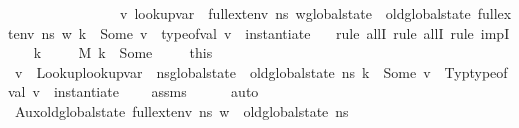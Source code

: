 \begin{isabellebody}
\ \ \ \ \ \ \ \ \ \ \ \ \ \ \ \ {\isacharparenleft}{\kern0pt}{\isasymexists}v{\isachardot}{\kern0pt}\ lookup{\isacharunderscore}{\kern0pt}var\ {\isasymLambda}\ {\isacharparenleft}{\kern0pt}{\isacharparenleft}{\kern0pt}full{\isacharunderscore}{\kern0pt}ext{\isacharunderscore}{\kern0pt}env\ n{\isacharunderscore}{\kern0pt}s\ w{\isacharparenright}{\kern0pt}{\isasymlparr}global{\isacharunderscore}{\kern0pt}state\ {\isacharcolon}{\kern0pt}{\isacharequal}{\kern0pt}\ old{\isacharunderscore}{\kern0pt}global{\isacharunderscore}{\kern0pt}state\ {\isacharparenleft}{\kern0pt}full{\isacharunderscore}{\kern0pt}ext{\isacharunderscore}{\kern0pt}env\ n{\isacharunderscore}{\kern0pt}s\ w{\isacharparenright}{\kern0pt}{\isasymrparr}{\isacharparenright}{\kern0pt}\ k\ {\isacharequal}{\kern0pt}\ Some\ v\ {\isasymand}\ type{\isacharunderscore}{\kern0pt}of{\isacharunderscore}{\kern0pt}val\ v\ {\isacharequal}{\kern0pt}\ instantiate\ {\isasymOmega}\ {\isasymtau}{\isacharparenright}{\kern0pt}{\isachardoublequoteclose}\isanewline
%
\isadelimproof
%
\endisadelimproof
%
\isatagproof
{}\isamarkupfalse%
\ {\isacharparenleft}{\kern0pt}rule\ allI{\isacharcomma}{\kern0pt}\ rule\ allI{\isacharcomma}{\kern0pt}\ rule\ impI{\isacharparenright}{\kern0pt}\isanewline
\ \ \isamarkupfalse%
\ k\ {\isasymtau}\isanewline
\ \ \isamarkupfalse%
\ {\isachardoublequoteopen}M\ k\ {\isacharequal}{\kern0pt}\ Some\ {\isasymtau}{\isachardoublequoteclose}\isanewline
\ \ \isamarkupfalse%
\ this\ \isamarkupfalse%
\ v\ \ Lookup{\isacharcolon}{\kern0pt}{\isachardoublequoteopen}lookup{\isacharunderscore}{\kern0pt}var\ {\isasymLambda}\ {\isacharparenleft}{\kern0pt}n{\isacharunderscore}{\kern0pt}s{\isasymlparr}global{\isacharunderscore}{\kern0pt}state\ {\isacharcolon}{\kern0pt}{\isacharequal}{\kern0pt}\ old{\isacharunderscore}{\kern0pt}global{\isacharunderscore}{\kern0pt}state\ n{\isacharunderscore}{\kern0pt}s{\isasymrparr}{\isacharparenright}{\kern0pt}\ k\ {\isacharequal}{\kern0pt}\ Some\ v{\isachardoublequoteclose}\ \ Typ{\isacharcolon}{\kern0pt}{\isachardoublequoteopen}type{\isacharunderscore}{\kern0pt}of{\isacharunderscore}{\kern0pt}val\ v\ {\isacharequal}{\kern0pt}\ instantiate\ {\isasymOmega}\ {\isasymtau}{\isachardoublequoteclose}\ \isamarkupfalse%
\ assms\isanewline
\ \ \ \ \isamarkupfalse%
\ auto\isanewline
\ \ \isamarkupfalse%
\ Aux{}{\isacharcolon}{\kern0pt}{\isachardoublequoteopen}old{\isacharunderscore}{\kern0pt}global{\isacharunderscore}{\kern0pt}state\ {\isacharparenleft}{\kern0pt}full{\isacharunderscore}{\kern0pt}ext{\isacharunderscore}{\kern0pt}env\ n{\isacharunderscore}{\kern0pt}s\ w{\isacharparenright}{\kern0pt}\ {\isacharequal}{\kern0pt}\ old{\isacharunderscore}{\kern0pt}global{\isacharunderscore}{\kern0pt}state\ n{\isacharunderscore}{\kern0pt}s{\isachardoublequoteclose}\isanewline

\end{isabellebody}
